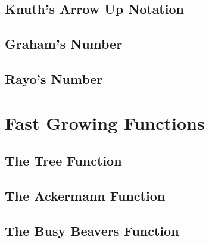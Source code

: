 
\subsection{Knuth's Arrow Up Notation}

\subsection{Graham's Number}


\subsection{Rayo's Number}





\section{Fast Growing Functions}

\subsection{The Tree Function}

\subsection{The Ackermann Function}

\subsection{The Busy Beavers Function}







